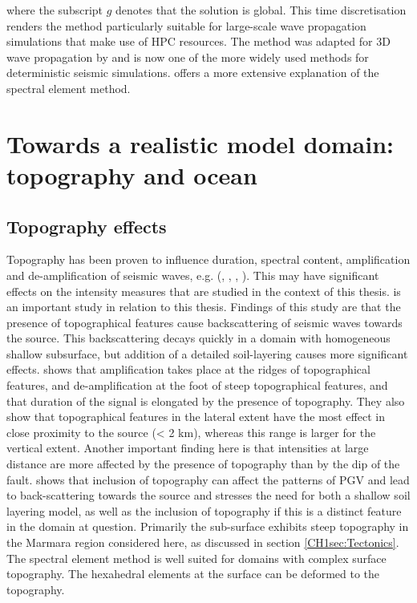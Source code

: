 \documentclass[../Text/00main.tex]{subfiles}
\begin{document}
where the subscript $g$ denotes that the solution is global. This time discretisation renders the method particularly suitable for large-scale wave propagation simulations that make use of HPC resources. The method was adapted for 3D wave propagation by \citet{komatitsch1999introduction} and is now one of the more widely used methods for deterministic seismic simulations. \citet{igel_spectral-element_2016} offers a more extensive explanation of the spectral element method. 



\section{Towards a realistic model domain: topography and ocean}

\subsection{Topography effects}

Topography has been proven to influence duration, spectral content, amplification and de-amplification of seismic waves, e.g. (\citet{veeraraghavan_simulation_2020}, \citet{pienkowska2020high}, \citet{stolte2017experimental}, \citet{imperatori2015role}). This may have significant effects on the intensity measures that are studied in the context of this thesis. \citet{veeraraghavan_simulation_2020} is an important study in relation to this thesis. Findings of this study are that the presence of topographical features cause backscattering of seismic waves towards the source. This backscattering decays quickly in a domain with homogeneous shallow subsurface, but addition of a detailed soil-layering causes more significant effects.  shows that amplification takes place at the ridges of topographical features, and de-amplification at the foot of steep topographical features, and that duration of the signal is elongated by the presence of topography. They also show that topographical features in the lateral extent have the most effect in close proximity to the source (< 2 km), whereas this range is larger for the vertical extent. Another important finding here is that intensities at large distance are more affected by the presence of topography than by the dip of the fault. \citep{imperatori2015role} shows that inclusion of topography can affect the patterns of PGV and lead to back-scattering towards the source and stresses the need for both a shallow soil layering model, as well as the inclusion of topography if this is a distinct feature in the domain at question. Primarily the sub-surface exhibits steep topography in the Marmara region considered here, as discussed in section \ref{CH1sec:Tectonics}. The spectral element method is well suited for domains with complex surface topography. The hexahedral elements at the surface can be deformed to the topography. 
\end{document}
